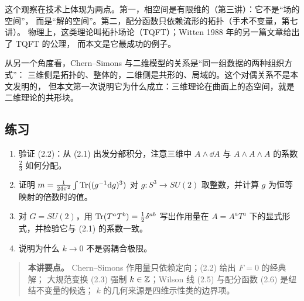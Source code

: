 这个观察在技术上体现为两点。第一，相空间是有限维的（第三讲）：它不是“场的空间”，
而是“解的空间”。第二，配分函数只依赖流形的拓扑（手术不变量，第七讲）。
物理上，这类理论叫拓扑场论（TQFT）；Witten 1988 年的另一篇文章给出了 TQFT 的公理，
而本文是它最成功的例子。

从另一个角度看，Chern--Simons 与二维模型的关系是“同一组数据的两种组织方式”：
三维侧是拓扑的、整体的，二维侧是共形的、局域的。这个对偶关系不是本文发明的，
但本文第一次说明它为什么成立：三维理论在曲面上的态空间，就是二维理论的共形块。

\subsection*{练习}
\begin{enumerate}[leftmargin=*]
  \item 验证 (2.2)：从 (2.1) 出发分部积分，注意三维中 $A\wedge\dd A$ 与 $A\wedge A\wedge A$ 的系数 $\frac23$ 如何分配。
  \item 证明 $m=\frac{1}{24\pi^2}\int\operatorname{Tr}((g^{-1}\mathrm{d} g)^3)$ 对 $g:S^3\to SU(2)$ 取整数，并计算 $g$ 为恒等映射的倍数时的值。
  \item 对 $G=SU(2)$，用 $\operatorname{Tr}(T^aT^b)=\frac12\delta^{ab}$ 写出作用量在 $A=A^aT^a$ 下的显式形式，并检验它与 (2.1) 的系数一致。
  \item 说明为什么 $k\to0$ 不是弱耦合极限。
\end{enumerate}

\begin{quote}
\small
\textbf{本讲要点。} Chern--Simons 作用量只依赖定向；(2.2) 给出 $F=0$ 的经典解；
大规范变换 (2.3) 强制 $k\in\mathbb{Z}$；Wilson 线 (2.5) 与配分函数 (2.6) 是纽结不变量的候选；
$k$ 的几何来源是四维示性类的边界项。
\end{quote}
